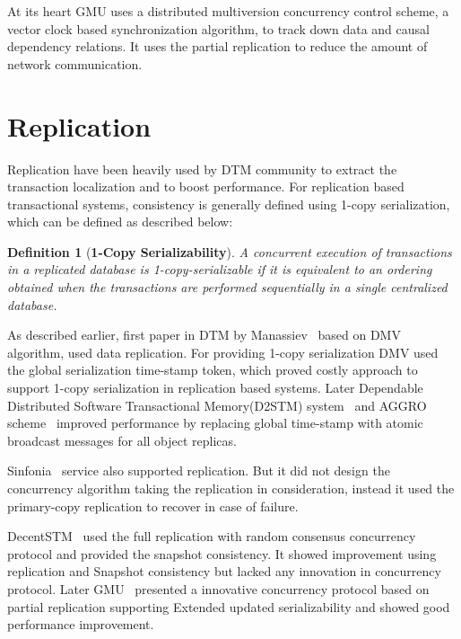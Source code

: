 \documentclass[12pt,english]{report}
\newtheorem{definition}{Definition}[section]
\begin{document}
At its heart GMU uses a distributed multiversion concurrency control scheme, a vector clock based synchronization algorithm, to track down data and causal dependency relations. It uses the partial replication to reduce the amount of network communication. 

\section{Replication}
Replication have been heavily used by DTM community to extract the transaction localization and to boost performance. For replication based transactional systems, consistency is generally defined using 1-copy serialization, which can be defined as described below:

\begin{definition}[\textbf{1-Copy Serializability}]
A concurrent execution of transactions in a replicated database is 1-copy-serializable if it is equivalent  to an ordering obtained when the transactions are performed sequentially in a single centralized database.~\cite{bornea2011one}
\end{definition}

As described earlier, first paper in DTM by Manassiev~\cite{Manassiev:2006:EDV:1122971.1123002} based on DMV algorithm, used data replication. For providing 1-copy serialization DMV used the global serialization time-stamp token, which proved costly approach to support 1-copy serialization in replication based systems. Later Dependable Distributed Software Transactional Memory(D2STM) system~\cite{D2STM:5368778} and AGGRO scheme~\cite{AGGRO:5598236} improved performance by replacing global time-stamp with atomic broadcast messages for all object replicas.  

Sinfonia~\cite{Aguilera:2009:SNP:1629087.1629088} service also supported replication. But it did not design the concurrency algorithm taking the replication in consideration, instead it used the primary-copy replication to recover in case of failure. 

DecentSTM~\cite{DecentSTM:5470446} used the full replication with random consensus concurrency protocol and provided the snapshot consistency. It showed improvement using replication and Snapshot consistency but lacked any innovation in concurrency protocol. Later GMU~\cite{GMU:peluso2012scalability} presented a innovative concurrency protocol based on partial replication supporting Extended updated serializability and showed good performance improvement. 
\end{document}
